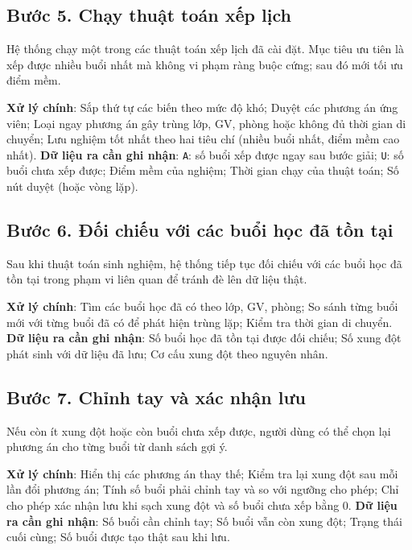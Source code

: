\documentclass[../DoAn.tex]{subfiles}
\begin{document}
\subsection{Bước 5. Chạy thuật toán xếp lịch}
Hệ thống chạy một trong các thuật toán xếp lịch đã cài đặt. Mục tiêu ưu tiên là xếp được nhiều buổi nhất mà không vi phạm ràng buộc cứng; sau đó mới tối ưu điểm mềm.

\textbf{Xử lý chính}: Sắp thứ tự các biến theo mức độ khó; Duyệt các phương án ứng viên; Loại ngay phương án gây trùng lớp, GV, phòng hoặc không đủ thời gian di chuyển; Lưu nghiệm tốt nhất theo hai tiêu chí (nhiều buổi nhất, điểm mềm cao nhất).
\textbf{Dữ liệu ra cần ghi nhận}: \texttt{A}: số buổi xếp được ngay sau bước giải; \texttt{U}: số buổi chưa xếp được; Điểm mềm của nghiệm; Thời gian chạy của thuật toán; Số nút duyệt (hoặc vòng lặp).

\subsection{Bước 6. Đối chiếu với các buổi học đã tồn tại}
Sau khi thuật toán sinh nghiệm, hệ thống tiếp tục đối chiếu với các buổi học đã tồn tại trong phạm vi liên quan để tránh đè lên dữ liệu thật.

\textbf{Xử lý chính}: Tìm các buổi học đã có theo lớp, GV, phòng; So sánh từng buổi mới với từng buổi đã có để phát hiện trùng lặp; Kiểm tra thời gian di chuyển.
\textbf{Dữ liệu ra cần ghi nhận}: Số buổi học đã tồn tại được đối chiếu; Số xung đột phát sinh với dữ liệu đã lưu; Cơ cấu xung đột theo nguyên nhân.

\subsection{Bước 7. Chỉnh tay và xác nhận lưu}
Nếu còn ít xung đột hoặc còn buổi chưa xếp được, người dùng có thể chọn lại phương án cho từng buổi từ danh sách gợi ý.

\textbf{Xử lý chính}: Hiển thị các phương án thay thế; Kiểm tra lại xung đột sau mỗi lần đổi phương án; Tính số buổi phải chỉnh tay và so với ngưỡng cho phép; Chỉ cho phép xác nhận lưu khi sạch xung đột và số buổi chưa xếp bằng 0.
\textbf{Dữ liệu ra cần ghi nhận}: Số buổi cần chỉnh tay; Số buổi vẫn còn xung đột; Trạng thái cuối cùng; Số buổi được tạo thật sau khi lưu.
\end{document}
